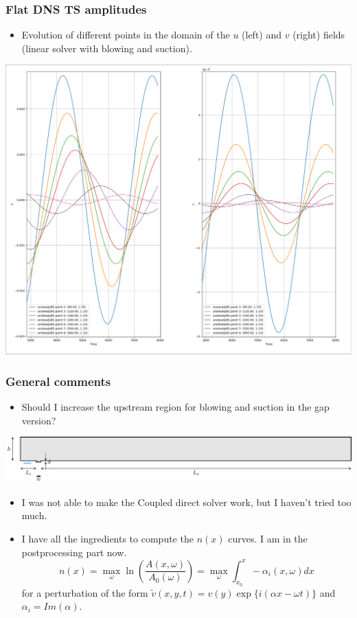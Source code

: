 \documentclass[
  aspectratio=169, %
  t, %
  onlytextwidth, %
  10pt, %
]{beamer}
\begin{document}
\begin{frame}
	\frametitle{Flat DNS TS amplitudes}
	\begin{itemize}
		\item Evolution of different points in the domain of the $u$ (left) and $v$ (right) fields (linear solver with blowing and suction).
	\end{itemize}
	\centering
	\includegraphics[width=0.5\linewidth]{Images/TS_amplitudeDNS_flat.png}
\end{frame}
\begin{frame}
	\frametitle{General comments}
	\begin{itemize}
		\item Should I increase the upstream region for blowing and suction in the gap version?
	\end{itemize}
	\centering
	\includegraphics[width=1\textwidth]{../../Images/domainBS.pdf}
	\begin{itemize}
		\item I was not able to make the Coupled direct solver work, but I haven't tried too much.
		\item I have all the ingredients to compute the $n(x)$ curves. I am in the postprocessing part now.
		      $$
			      n(x) = \max_{\omega} \ln\left(\frac{A(x,\omega)}{A_0(\omega)}\right) =\max_\omega \int_{x_0}^{x} -\alpha_i(x,\omega) dx
		      $$
		      for a perturbation of the form $\tilde{v}(x,y,t) = v(y) \exp\{i(\alpha x-\omega t)\}$ and $\alpha_i=Im(\alpha)$.
	\end{itemize}
\end{frame}
\end{document}
